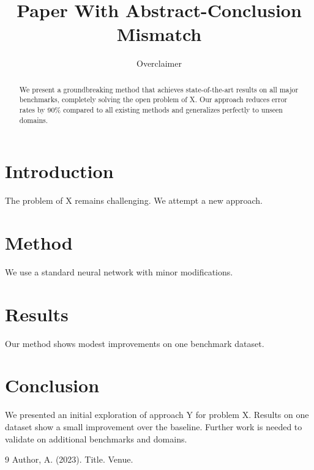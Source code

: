 \documentclass{article}
\title{Paper With Abstract-Conclusion Mismatch}
\author{Overclaimer}
\begin{document}
\maketitle

\begin{abstract}
We present a groundbreaking method that achieves state-of-the-art results
on all major benchmarks, completely solving the open problem of X.
Our approach reduces error rates by 90\% compared to all existing methods
and generalizes perfectly to unseen domains.
\end{abstract}

\section{Introduction}
\label{sec:intro}

The problem of X remains challenging. We attempt a new approach.

\section{Method}
\label{sec:method}

We use a standard neural network with minor modifications.

\section{Results}
\label{sec:results}

Our method shows modest improvements on one benchmark dataset.

\section{Conclusion}
\label{sec:conclusion}

We presented an initial exploration of approach Y for problem X.
Results on one dataset show a small improvement over the baseline.
Further work is needed to validate on additional benchmarks and domains.

\begin{thebibliography}{9}
 Author, A. (2023). Title. Venue.
\end{thebibliography}
\end{document}
